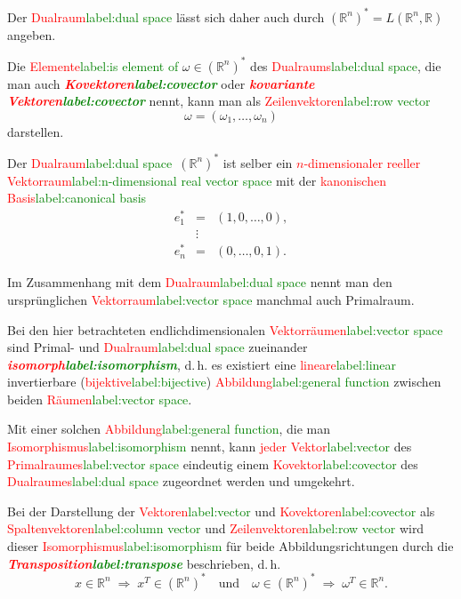 \documentclass[a4paper,twoside,english,ngerman,deutsch,german,sectrefs,envcountsame,envcountchap]{svmono}
\newcommand{\setref}[2]{\textcolor{red}{#1}\textcolor{green}{#2}}
\begin{document}
Der \setref{Dualraum}{label:dual space} lässt sich daher auch durch $({\mathbb{R}}^{n})^{*}=L({\mathbb{R}}^{n},{\mathbb{R}})$ angeben.

Die \setref{Elemente}{label:is element of} $\omega\in({\mathbb{R}}^{n})^{*}$ des \setref{Dualraums}{label:dual space}, die man auch \textbf{\em \setref{Kovektoren}{label:covector}} oder \textbf{\em \setref{kovariante Vektoren}{label:covector}} nennt, kann man als \setref{Zeilenvektoren}{label:row vector}
\[
\omega=\left(\omega_{1},\ldots,\omega_{n}\right)
\]
darstellen.

Der \setref{Dualraum}{label:dual space}~$(\mathbb{R}^{n})^{*}$ ist selber ein \setref{$n$-dimensionaler reeller Vektorraum}{label:n-dimensional real vector space} mit der \setref{kanonischen Basis}{label:canonical basis}
\[
\begin{array}{lcl}
e_{1}^{*} & = & \left(1,0,\ldots,0\right),\\
 & \vdots\\
e_{n}^{*} & = & (0,\ldots,0,1).
\end{array}
\]

Im Zusammenhang mit dem \setref{Dualraum}{label:dual space} nennt man den ursprünglichen \setref{Vektorraum}{label:vector space} manchmal auch Primalraum.

\begin{remark}
\label{rem:Isomorphismus-Primal-Dual}Bei den hier betrachteten endlichdimensionalen
\setref{Vektorräumen}{label:vector space} sind Primal- und \setref{Dualraum}{label:dual space} zueinander \textbf{\em \setref{isomorph}{label:isomorphism}},
d.\,h. es existiert eine \setref{lineare}{label:linear} invertierbare (\setref{bijektive}{label:bijective}) \setref{Abbildung}{label:general function} zwischen beiden \setref{Räumen}{label:vector space}.
\end{remark}

Mit einer solchen \setref{Abbildung}{label:general function}, die man \setref{Isomorphismus}{label:isomorphism} nennt, kann \setref{jeder Vektor}{label:vector} des \setref{Primalraumes}{label:vector space} eindeutig einem \setref{Kovektor}{label:covector} des \setref{Dualraumes}{label:dual space} zugeordnet werden und umgekehrt.

Bei der Darstellung der \setref{Vektoren}{label:vector} und \setref{Kovektoren}{label:covector} als \setref{Spaltenvektoren}{label:column vector} und \setref{Zeilenvektoren}{label:row vector} wird dieser
\setref{Isomorphismus}{label:isomorphism} für beide Abbildungsrichtungen durch die \textbf{\em \setref{Transposition}{label:transpose}}
beschrieben, d.\,h.
\[
x\in{\mathbb{R}}^{n}\;\Rightarrow\;x^{T}\in({\mathbb{R}}^{n})^{*}\quad\text{und}\quad\omega\in({\mathbb{R}}^{n})^{*}\;\Rightarrow\;\omega^{T}\in{\mathbb{R}}^{n}.
\]
\end{document}
